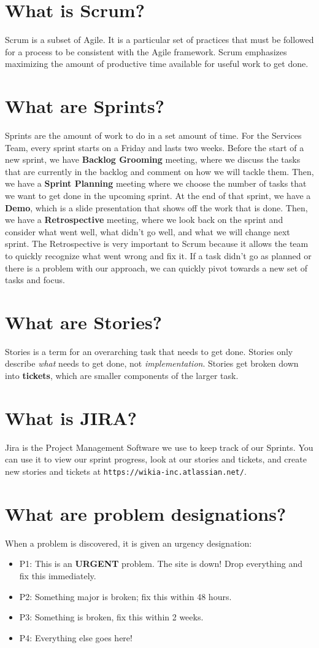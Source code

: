 \documentclass[oneside]{book}
\begin{document}
\section{What is Scrum?}
Scrum is a subset of Agile. It is a particular set of practices that must be followed for a process to be consistent with the Agile framework. Scrum emphasizes maximizing the amount of productive time available for useful work to get done. 
\section{What are Sprints?}
Sprints are the amount of work to do in a set amount of time. For the Services Team, every sprint starts on a Friday and lasts two weeks.  Before the start of a new sprint, we have \textbf{Backlog Grooming} meeting, where we discuss the tasks that are currently in the backlog and comment on how we will tackle them. Then, we have a \textbf{Sprint Planning} meeting where we choose the number of tasks that we want to get done in the upcoming sprint. At the end of that sprint, we have a \textbf{Demo}, which is a slide presentation that shows off the work that is done. Then, we have a \textbf{Retrospective} meeting, where we look back on the sprint and consider what went well, what didn't go well, and what we will change next sprint. The Retrospective is very important to Scrum because it allows the team to quickly recognize what went wrong and fix it. If a task didn't go as planned or there is a problem with our approach, we can quickly pivot towards a new set of tasks and focus.
\section{What are Stories?}
Stories is a term for an overarching task that needs to get done. Stories only describe \textit{what} needs to get done, not \textit{implementation}. Stories get broken down into \textbf{tickets}, which are smaller components of the larger task. 
\section{What is JIRA?}
Jira is the Project Management Software we use to keep track of our Sprints. You can use it to view our sprint progress, look at our stories and tickets, and create new stories and tickets at \texttt{https://wikia-inc.atlassian.net/}. 
\section{What are problem designations?}
When a problem is discovered, it is given an urgency designation:
\begin{itemize}
	\item P1: This is an \textbf{URGENT} problem. The site is down! Drop everything and fix this immediately.
	\item P2: Something major is broken; fix this within 48 hours.
	\item P3: Something is broken, fix this within 2 weeks.
	\item P4: Everything else goes here!
\end{itemize}
\end{document}
